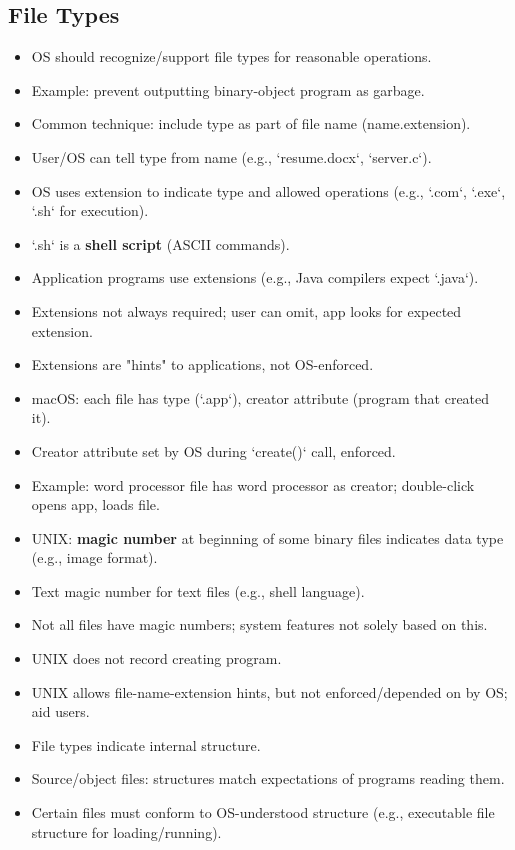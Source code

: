 \subsection*{File Types}
\begin{itemize}
    \item OS should recognize/support file types for reasonable operations.
    \item Example: prevent outputting binary-object program as garbage.
    \item Common technique: include type as part of file name (name.extension).
    \item User/OS can tell type from name (e.g., `resume.docx`, `server.c`).
    \item OS uses extension to indicate type and allowed operations (e.g., `.com`, `.exe`, `.sh` for execution).
    \item `.sh` is a \textbf{shell script} (ASCII commands).
    \item Application programs use extensions (e.g., Java compilers expect `.java`).
    \item Extensions not always required; user can omit, app looks for expected extension.
    \item Extensions are "hints" to applications, not OS-enforced.
    \item macOS: each file has type (`.app`), creator attribute (program that created it).
    \item Creator attribute set by OS during `create()` call, enforced.
    \item Example: word processor file has word processor as creator; double-click opens app, loads file.
    \item UNIX: \textbf{magic number} at beginning of some binary files indicates data type (e.g., image format).
    \item Text magic number for text files (e.g., shell language).
    \item Not all files have magic numbers; system features not solely based on this.
    \item UNIX does not record creating program.
    \item UNIX allows file-name-extension hints, but not enforced/depended on by OS; aid users.
\item File types indicate internal structure.
\item Source/object files: structures match expectations of programs reading them.
\item Certain files must conform to OS-understood structure (e.g., executable file structure for loading/running).

\end{itemize}

